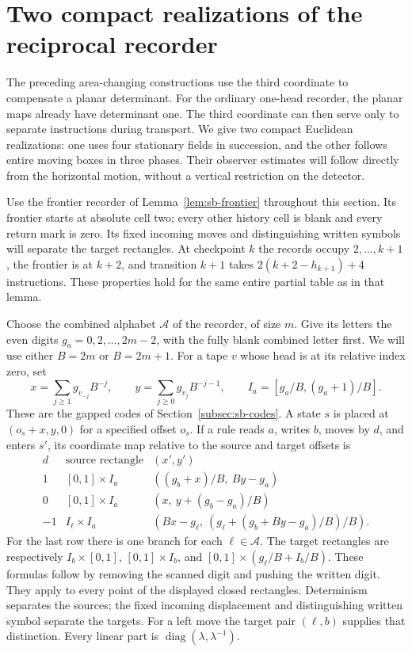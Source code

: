 \section{Two compact realizations of the reciprocal recorder}
\label{subsec:p2:rapid-periodic}
The preceding area-changing constructions use the third coordinate to
compensate a planar determinant. For the ordinary one-head recorder,
the planar maps already have determinant one. The third coordinate can
then serve only to separate instructions during transport. We give two
compact Euclidean realizations: one uses four stationary fields in
succession, and the other follows entire moving boxes in three phases.
Their observer estimates will follow directly from the horizontal
motion, without a vertical restriction on the detector.

Use the frontier recorder of Lemma~\ref{lem:sb-frontier} throughout this
section. Its frontier starts at absolute cell two; every other history
cell is blank and every return mark is zero. Its fixed incoming moves
and distinguishing written symbols will separate the target rectangles.
At checkpoint $k$ the records occupy $2,\ldots,k+1$, the frontier is at
$k+2$, and transition $k+1$ takes $2(k+2-h_{k+1})+4$ instructions.
These properties hold for the same entire partial table as in that lemma.

Choose the combined alphabet $\mathcal A$ of the recorder, of size $m$.
Give its letters the even digits $g_a=0,2,\ldots,2m-2$, with the fully
blank combined letter first. We will use either $B=2m$ or $B=2m+1$.
For a tape $v$ whose head is at its relative index zero, set
\[
 x=\sum_{j\ge1}g_{v_{-j}}B^{-j},\qquad
 y=\sum_{j\ge0}g_{v_j}B^{-j-1},\qquad
 I_a=[g_a/B,(g_a+1)/B].
\]
These are the gapped codes of Section~\ref{subsec:sb-codes}.
A state $s$ is placed at $(o_s+x,y,0)$ for a specified offset $o_s$.
If a rule reads $a$, writes $b$, moves by $d$, and enters $s'$, its
coordinate map relative to the source and target offsets is
\begin{equation}\label{eq:p2:rapid-rectangle-rules}
\begin{array}{c|c|c}
 d&\text{source rectangle}&(x',y')\\\hline
 1 &[0,1]\times I_a&((g_b+x)/B,\ By-g_a)\\
 0 &[0,1]\times I_a&(x,\ y+(g_b-g_a)/B)\\
 -1&I_\ell\times I_a&
 (Bx-g_\ell,\ (g_\ell+(g_b+By-g_a)/B)/B).
\end{array}
\end{equation}
For the last row there is one branch for each $\ell\in\mathcal A$.
The target rectangles are respectively $I_b\times[0,1]$,
$[0,1]\times I_b$, and $[0,1]\times(g_\ell/B+I_b/B)$.
These formulas follow by removing the scanned digit and pushing the
written digit. They apply to every point of the displayed closed
rectangles. Determinism separates the sources; the fixed incoming
displacement and distinguishing written symbol separate the targets.
For a left move the target pair $(\ell,b)$ supplies that distinction.
Every linear part is $\operatorname{diag}(\lambda,\lambda^{-1})$.

